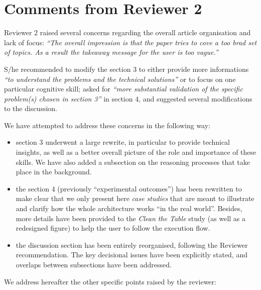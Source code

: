 \documentclass{article}
\begin{document}
\section{Comments from Reviewer 2}

Reviewer 2 raised several concerns regarding the overall article organisation
and lack of focus: \emph{``The overall impression is that the paper tries to
cove a too brad set of topics. As a result the takeaway message for the user is
too vague.''}

S/he recommended to modify the section 3 to either provide more informations
\emph{``to understand the problems and the technical solutions''} or to focus on
one particular cognitive skill; asked for \emph{``more substantial validation
of the specific problem(s) chosen in section 3''} in section 4, and suggested
several modifications to the discussion.

We have attempted to address these concerns in the following way:

\begin{itemize}
    \item section 3 underwent a large rewrite, in particular to provide
        technical insights, as well as a better overall picture of the role and
        importance of these skills. We have also added a subsection on the
        reasoning processes that take place in the background.
    \item the section 4 (previously ``experimental outcomes'') has been
        rewritten to make clear that we only present here \emph{case studies}
        that are meant to illustrate and clarify how the whole architecture
        works ``in the real world''. Besides, more details have been provided to the
        \emph{Clean the Table} study (as well as a redesigned figure) to help
        the user to follow the execution flow.
    \item the discussion section has been entirely reorganised, following the
        Reviewer recommendation. The key decisional issues have been explicitly
        stated, and overlaps between subsections have been addressed.
\end{itemize}

We address hereafter the other specific points raised by the reviewer:
\end{document}
